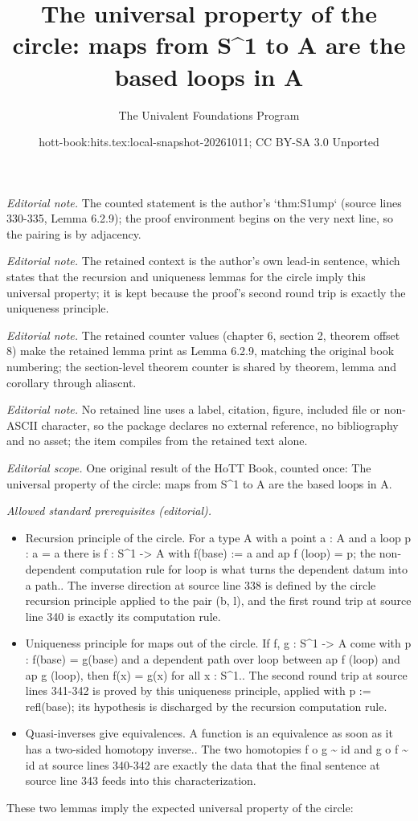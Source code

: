 \documentclass[10pt,a4paper]{article}
\title{The universal property of the circle: maps from S\textasciicircum{}1 to A are the based loops in A}
\author{The Univalent Foundations Program}
\date{hott-book:hits.tex:local-snapshot-20261011; CC BY-SA 3.0 Unported}
\newcounter{chapter}
\providecommand{\index}[1]{}
\newcommand{\Sn}{\mathbb{S}}
\theoremstyle{definition}
\theoremstyle{remark}
\numberwithin{equation}{section}
\begin{document}
\maketitle
\setcounter{chapter}{6}
\setcounter{section}{2}
\setcounter{thm}{8}
\noindent\textit{Editorial note.} The counted statement is the author's `thm:S1ump` (source lines 330-335, Lemma 6.2.9); the proof environment begins on the very next line, so the pairing is by adjacency.\par\medskip
\noindent\textit{Editorial note.} The retained context is the author's own lead-in sentence, which states that the recursion and uniqueness lemmas for the circle imply this universal property; it is kept because the proof's second round trip is exactly the uniqueness principle.\par\medskip
\noindent\textit{Editorial note.} The retained counter values (chapter 6, section 2, theorem offset 8) make the retained lemma print as Lemma 6.2.9, matching the original book numbering; the section-level theorem counter is shared by theorem, lemma and corollary through aliascnt.\par\medskip
\noindent\textit{Editorial note.} No retained line uses a label, citation, figure, included file or non-ASCII character, so the package declares no external reference, no bibliography and no asset; the item compiles from the retained text alone.\par\medskip
\noindent\textit{Editorial scope.} One original result of the HoTT Book, counted once: The universal property of the circle: maps from S\textasciicircum{}1 to A are the based loops in A.\par\medskip
\noindent\textit{Allowed standard prerequisites (editorial).}\begin{itemize}
\item Recursion principle of the circle. For a type A with a point a : A and a loop p : a = a there is f : S\textasciicircum{}1 -> A with f(base) := a and ap f (loop) = p; the non-dependent computation rule for loop is what turns the dependent datum into a path.. The inverse direction at source line 338 is defined by the circle recursion principle applied to the pair (b, l), and the first round trip at source line 340 is exactly its computation rule.
\item Uniqueness principle for maps out of the circle. If f, g : S\textasciicircum{}1 -> A come with p : f(base) = g(base) and a dependent path over loop between ap f (loop) and ap g (loop), then f(x) = g(x) for all x : S\textasciicircum{}1.. The second round trip at source lines 341-342 is proved by this uniqueness principle, applied with p := refl(base); its hypothesis is discharged by the recursion computation rule.
\item Quasi-inverses give equivalences. A function is an equivalence as soon as it has a two-sided homotopy inverse.. The two homotopies f o g \textasciitilde{} id and g o f \textasciitilde{} id at source lines 340-342 are exactly the data that the final sentence at source line 343 feeds into this characterization.
\end{itemize}\medskip
\index{universal!property!of S1@of $\Sn^1$}%
These two lemmas imply the expected universal property of the circle:
\end{document}
